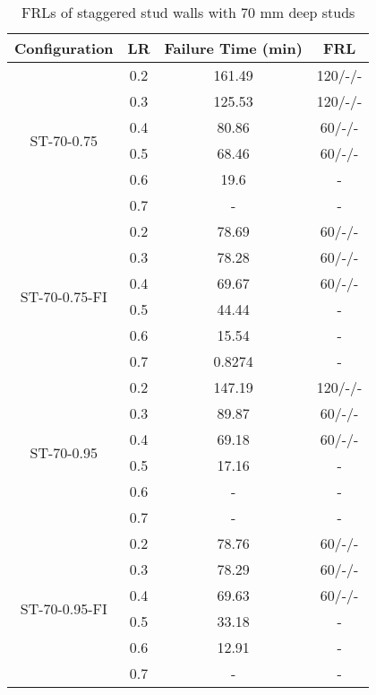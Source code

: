 \begin{table}[!htbp]
	\centering
	\caption{FRLs of staggered stud walls with 70 mm deep studs}
	  \begin{tabular}{cccc}
	  \toprule
	  Configuration & LR    & Failure Time (min) & FRL \\
	  \midrule
	  \multirow{6}[2]{*}{ST-70-0.75} & 0.2   & 161.49 & 120/-/- \\
			& 0.3   & 125.53 & 120/-/- \\
			& 0.4   & 80.86 & 60/-/- \\
			& 0.5   & 68.46 & 60/-/- \\
			& 0.6   & 19.6  & - \\
			& 0.7   & -     & - \\
	  \midrule
	  \multirow{6}[2]{*}{ST-70-0.75-FI} & 0.2   & 78.69 & 60/-/- \\
			& 0.3   & 78.28 & 60/-/- \\
			& 0.4   & 69.67 & 60/-/- \\
			& 0.5   & 44.44 & - \\
			& 0.6   & 15.54 & - \\
			& 0.7   & 0.8274 & - \\
	  \midrule
	  \multirow{6}[2]{*}{ST-70-0.95} & 0.2   & 147.19 & 120/-/- \\
			& 0.3   & 89.87 & 60/-/- \\
			& 0.4   & 69.18 & 60/-/- \\
			& 0.5   & 17.16 & - \\
			& 0.6   & -     & - \\
			& 0.7   & -     & - \\
	  \midrule
	  \multirow{6}[2]{*}{ST-70-0.95-FI} & 0.2   & 78.76 & 60/-/- \\
			& 0.3   & 78.29 & 60/-/- \\
			& 0.4   & 69.63 & 60/-/- \\
			& 0.5   & 33.18 & - \\
			& 0.6   & 12.91 & - \\
			& 0.7   & -     & - \\
	  \bottomrule
	  \end{tabular}%
	\label{tab:frl-parametric-st-70}%
\end{table}%

